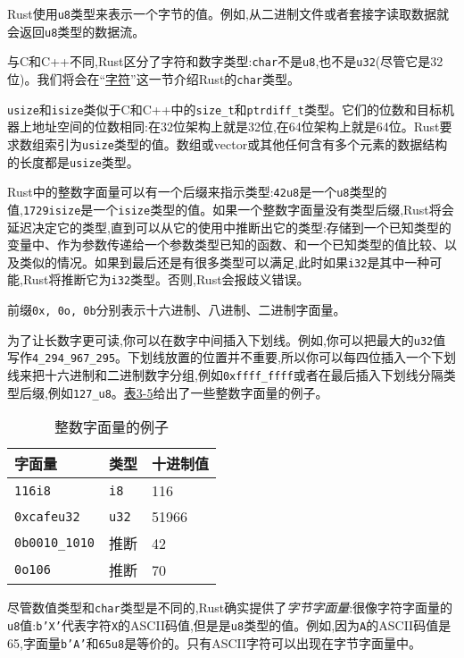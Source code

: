 Rust使用\texttt{u8}类型来表示一个字节的值。例如,从二进制文件或者套接字读取数据就会返回\texttt{u8}类型的数据流。

与C和C++不同,Rust区分了字符和数字类型:\texttt{char}不是\texttt{u8},也不是\texttt{u32}(尽管它是32位)。我们将会在“\hyperref[char]{字符}”这一节介绍Rust的\texttt{char}类型。

\texttt{usize}和\texttt{isize}类似于C和C++中的\texttt{size\_t}和\texttt{ptrdiff\_t}类型。它们的位数和目标机器上地址空间的位数相同:在32位架构上就是32位,在64位架构上就是64位。Rust要求数组索引为\texttt{usize}类型的值。数组或vector或其他任何含有多个元素的数据结构的长度都是\texttt{usize}类型。

Rust中的整数字面量可以有一个后缀来指示类型:\texttt{42u8}是一个\texttt{u8}类型的值,\texttt{1729isize}是一个\texttt{isize}类型的值。如果一个整数字面量没有类型后缀,Rust将会延迟决定它的类型,直到可以从它的使用中推断出它的类型:存储到一个已知类型的变量中、作为参数传递给一个参数类型已知的函数、和一个已知类型的值比较、以及类似的情况。如果到最后还是有很多类型可以满足,此时如果\texttt{i32}是其中一种可能,Rust将推断它为\texttt{i32}类型。否则,Rust会报歧义错误。

前缀\texttt{0x, 0o, 0b}分别表示十六进制、八进制、二进制字面量。

为了让长数字更可读,你可以在数字中间插入下划线。例如,你可以把最大的\texttt{u32}值写作\texttt{4\_294\_967\_295}。下划线放置的位置并不重要,所以你可以每四位插入一个下划线来把十六进制和二进制数字分组,例如\texttt{0xffff\_ffff}或者在最后插入下划线分隔类型后缀,例如\texttt{127\_u8}。\hyperref[t3-5]{表3-5}给出了一些整数字面量的例子。
\begin{table}[htbp]
    \centering
    \caption{整数字面量的例子}
    \label{t3-5}
    \begin{tabular}{lll}
        \hline
        \textbf{字面量} & \textbf{类型} & \textbf{十进制值} \\
        \hline
        \texttt{116i8}          & \texttt{i8}       &   116 \\
        \rowcolor{tablecolor}
        \texttt{0xcafeu32}      & \texttt{u32}      &   51966 \\
        \texttt{0b0010\_1010}   & 推断              &   42 \\
        \rowcolor{tablecolor}
        \texttt{0o106}          & 推断              &   70 \\
    \end{tabular}
\end{table}

尽管数值类型和\texttt{char}类型是不同的,Rust确实提供了\emph{字节字面量}:很像字符字面量的\texttt{u8}值:\texttt{b'X'}代表字符\texttt{X}的ASCII码值,但是是\texttt{u8}类型的值。例如,因为\texttt{A}的ASCII码值是65,字面量\texttt{b'A'}和\texttt{65u8}是等价的。只有ASCII字符可以出现在字节字面量中。

